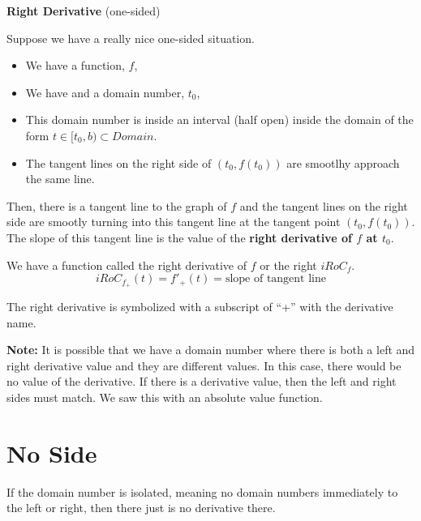 \documentclass{ximera}
\begin{document}
\begin{definition} \textbf{\textcolor{green!50!black}{Right Derivative}}  (one-sided) 


Suppose we have a really nice one-sided situation.


\begin{itemize}
\item We have a function, $f$, 
\item We have and a domain number, $t_0$, 
\item This domain number is inside an interval (half open) inside the domain of the form  $t \in [t_0, b) \subset Domain$. 
\item The tangent lines on the right side of $(t_0, f(t_0))$ are smootlhy approach the same line.
\end{itemize}

Then, there is a tangent line to the graph of $f$ and the tangent lines on the right side are smootly turning into this tangent line at the tangent point $(t_0, f(t_0))$. \\

The slope of this tangent line is the value of the \textbf{right derivative of $f$ at $t_0$}.


We have a function called the right derivative of $f$ or the right $iRoC_f$. \\

\[
iRoC_{f_{+}}(t) =f'_{+}(t) = \text{slope of tangent line}
\]


The right derivative is symbolized with a subscript of ``+'' with the derivative name. \\ 

\end{definition}



\textbf{Note:} It is possible that we have a domain number where there is both a left and right derivative value and they are different values.  In this case, there would be no value of the derivative.  If there is a derivative value, then the left and right sides must match.  We saw this with an absolute value function.





\section*{No Side}


If the domain number is isolated, meaning no domain numbers immediately to the left or right, then there just is no derivative there. \\
\end{document}
